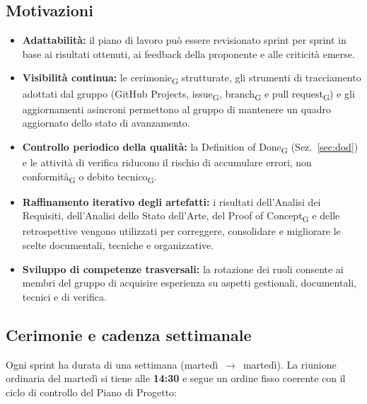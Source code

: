 \subsection{Motivazioni}

\begin{itemize}
    \item \textbf{Adattabilità:} il piano di lavoro può essere revisionato sprint
    per sprint in base ai risultati ottenuti, ai feedback della proponente e alle
    criticità emerse.

    \item \textbf{Visibilità continua:} le cerimonie\textsubscript{G} strutturate,
    gli strumenti di tracciamento adottati dal gruppo (GitHub Projects,
    issue\textsubscript{G}, branch\textsubscript{G} e pull request\textsubscript{G})
    e gli aggiornamenti asincroni permettono al gruppo di mantenere un quadro
    aggiornato dello stato di avanzamento.

    \item \textbf{Controllo periodico della qualità:} la Definition of
    Done\textsubscript{G} (Sez.~\ref{sec:dod}) e le attività di verifica riducono
    il rischio di accumulare errori, non conformità\textsubscript{G} o debito
    tecnico\textsubscript{G}.

    \item \textbf{Raffinamento iterativo degli artefatti:} i risultati
    dell'Analisi dei Requisiti, dell'Analisi dello Stato dell'Arte, del Proof of
    Concept\textsubscript{G} e delle retrospettive vengono utilizzati per
    correggere, consolidare e migliorare le scelte documentali, tecniche e
    organizzative.

    \item \textbf{Sviluppo di competenze trasversali:} la rotazione dei ruoli
    consente ai membri del gruppo di acquisire esperienza su aspetti gestionali,
    documentali, tecnici e di verifica.
\end{itemize}

\subsection{Cerimonie e cadenza settimanale}

Ogni sprint ha durata di una settimana (martedì~$\rightarrow$~martedì).
La riunione ordinaria del martedì si tiene alle \textbf{14:30} e segue un ordine
fisso coerente con il ciclo di controllo del Piano di Progetto:

